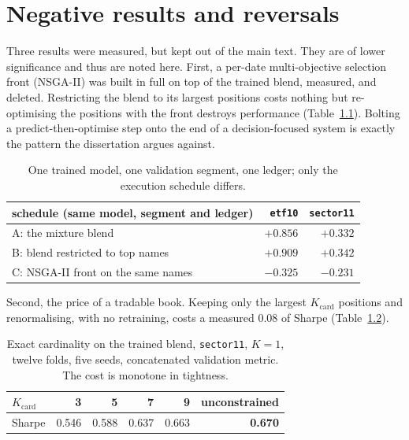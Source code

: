 \chapter{Negative results and reversals}
\label{app:negative}

Three results were measured, but kept out of the main text.
They are of lower significance and thus are noted here.
First, a per-date multi-objective selection front (NSGA-II) was built in full on top of the trained blend, measured, and deleted. Restricting the blend to its largest positions costs nothing but re-optimising the positions with the
front destroys performance (Table~\ref{tab:app-nsga}). Bolting a predict-then-optimise step onto the end of a decision-focused system is exactly the pattern the dissertation argues against.

\begin{table}[t]
  \centering
  \begin{tabular}{l rr}
    \hline
    schedule (same model, segment and ledger) & \texttt{etf10} & \texttt{sector11} \\
    \hline
    A: the mixture blend                  & $+0.856$ & $+0.332$ \\
    B: blend restricted to top names      & $+0.909$ & $+0.342$ \\
    C: NSGA-II front on the same names    & $-0.325$ & $-0.231$ \\
    \hline
  \end{tabular}
  \caption[The retired selection front]{One trained model, one validation
  segment, one ledger; only the execution schedule differs.}
  \label{tab:app-nsga}
\end{table}

Second, the price of a tradable book. Keeping only the largest $K_{\text{card}}$
positions and renormalising, with no retraining, costs a measured
$0.08$ of Sharpe (Table~\ref{tab:app-card}).

\begin{table}[t]
  \centering
  \begin{tabular}{l rrrrr}
    \hline
    $K_{\text{card}}$ & 3 & 5 & 7 & 9 & unconstrained \\
    \hline
    Sharpe & 0.546 & 0.588 & 0.637 & 0.663 & \textbf{0.670} \\
    \hline
  \end{tabular}
  \caption[The price of cardinality]{Exact cardinality on the trained blend,
  \texttt{sector11}, $K=1$, twelve folds, five seeds, concatenated
  validation metric. The cost is monotone in tightness.}
  \label{tab:app-card}
\end{table}

